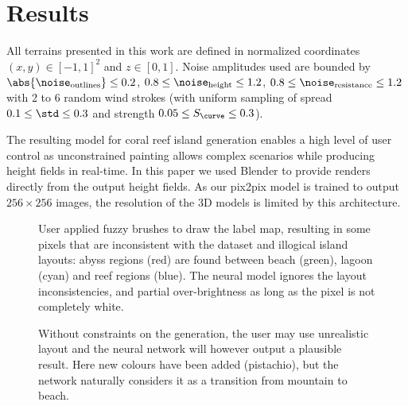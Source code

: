 \section{Results}
\label{sec:coral-island-results}

All terrains presented in this work are defined in normalized coordinates $(x, y) \in [-1, 1]^2$ and $z \in [0, 1]$. Noise amplitudes used are bounded by $\abs{\noise_{\text{outlines}}} \leq 0.2$, $0.8 \leq \noise_{\text{height}} \leq 1.2$, $0.8 \leq \noise_{\text{resistance}} \leq 1.2$ with 2 to 6 random wind strokes (with uniform sampling of spread $0.1 \leq \std \leq 0.3$ and strength $0.05 \leq S_\curve \leq 0.3$).

The resulting model for coral reef island generation enables a high level of user control as unconstrained painting allows complex scenarios while producing height fields in real-time. In this paper we used Blender to provide renders directly from the output height fields. As our pix2pix model is trained to output $256\times256$ images, the resolution of the 3D models is limited by this architecture.

\begin{figure}[tb]
    \caption[Output of the cGAN on fuzzy inputs]{User applied fuzzy brushes to draw the label map, resulting in some pixels that are inconsistent with the dataset and illogical island layouts: abyss regions (red) are found between beach (green), lagoon (cyan) and reef regions (blue). The neural model ignores the layout inconsistencies, and partial over-brightness as long as the pixel is not completely white.}
    \label{fig:coral-island-results-fuzzy}
\end{figure}
\begin{figure}[tb]
    \caption[Output of the cGAN with new colors in the input]{Without constraints on the generation, the user may use unrealistic layout and the neural network will however output a plausible result. Here new colours have been added (pistachio), but the network naturally considers it as a transition from mountain to beach.}
    \label{fig:coral-island-results-dino}
\end{figure}



